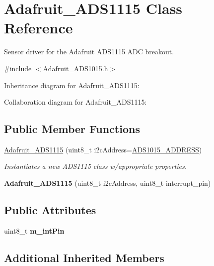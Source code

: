 \hypertarget{class_adafruit___a_d_s1115}{}\section{Adafruit\+\_\+\+A\+D\+S1115 Class Reference}
\label{class_adafruit___a_d_s1115}


Sensor driver for the Adafruit A\+D\+S1115 A\+DC breakout.  




{\ttfamily \#include $<$Adafruit\+\_\+\+A\+D\+S1015.\+h$>$}



Inheritance diagram for Adafruit\+\_\+\+A\+D\+S1115\+:


Collaboration diagram for Adafruit\+\_\+\+A\+D\+S1115\+:
\subsection*{Public Member Functions}
\begin{DoxyCompactItemize}
\item 
\hyperlink{class_adafruit___a_d_s1115_a7058cf2c75b673fb0b0a8936c3edd1fd}{Adafruit\+\_\+\+A\+D\+S1115} (uint8\+\_\+t i2c\+Address=\hyperlink{_adafruit___a_d_s1015_8h_ae55d158023984e8f0ddc80b58d5b30dc}{A\+D\+S1015\+\_\+\+A\+D\+D\+R\+E\+SS})
\begin{DoxyCompactList}\small\item\em Instantiates a new A\+D\+S1115 class w/appropriate properties. \end{DoxyCompactList}\item 
\mbox{\label{class_adafruit___a_d_s1115_a65e8b9688cc908b0a4ab8830c35656b7}} 
{\bfseries Adafruit\+\_\+\+A\+D\+S1115} (uint8\+\_\+t i2c\+Address, uint8\+\_\+t interrupt\+\_\+pin)
\end{DoxyCompactItemize}
\subsection*{Public Attributes}
\begin{DoxyCompactItemize}
\item 
\mbox{\label{class_adafruit___a_d_s1115_a89e6560febfb9d205962758843717314}} 
uint8\+\_\+t {\bfseries m\+\_\+int\+Pin}
\end{DoxyCompactItemize}
\subsection*{Additional Inherited Members}



